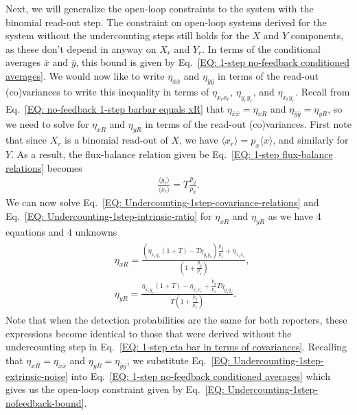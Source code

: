 \documentclass[%
 reprint,prx,
superscriptaddress,
%
%
%
%
%
%
%
%
%
 amsmath,amssymb,
 aps,
%
%
%
%
%
%
]{revtex4-2}
\begin{document}
{{Next, we will generalize the open-loop constraints to the system with the binomial read-out step. The constraint on open-loop systems derived for the system without the undercounting steps still holds for the $X$ and $Y$ components, as these don't depend in anyway on $X_{r}$ and $Y_{r}$. In terms of the conditional averages $\bar{x}$ and $\bar{y}$, this bound is given by Eq.~\eqref{EQ: 1-step no-feedback conditioned averages}. We would now like to write $\eta_{\bar{x}\bar{x}}$ and $\eta_{\bar{y}\bar{y}}$ in terms of the read-out (co)variances to write this inequality in terms of $\eta_{x_{r}x_{r}}$, $\eta_{y_{r}y_{r}}$, and $\eta_{x_{r}y_{r}}$. Recall from Eq.~\eqref{EQ: no-feedback 1-step barbar equals xR} that $\eta_{\bar{x}\bar{x}} = \eta_{xR}$ and $\eta_{\bar{y}\bar{y}} = \eta_{yR}$, so we need to solve for $\eta_{xR}$ and $\eta_{yR}$ in terms of the read-out (co)variances. 
First note that since $X_{r}$ is a binomial read-out of $X$, we have $\langle x_{r} \rangle = p_{x} \langle x \rangle$, and similarly for $Y$. As a result, the flux-balance relation given be Eq.~\eqref{EQ: 1-step flux-balance relations} becomes
\begin{align}
     \frac{\langle y_{r} \rangle}{\langle x_{r} \rangle} = T\frac{p_{y}}{p_{x}}.
    \label{EQ: Undercounting-1step-intrinsic-ratio}
\end{align}
We can now solve Eq.~\eqref{EQ: Undercounting-1step-covariance-relations} and  Eq.~\eqref{EQ: Undercounting-1step-intrinsic-ratio} for $\eta_{xR}$ and $\eta_{yR}$ as we have 4 equations and 4 unknowns
\begin{align}
    \begin{split}
    &\eta_{xR} = \frac{\left(\eta_{x_{r}y_{r}}(1+T) - T\eta_{y_{r}y_{r}}\right)\frac{p_{y}}{p_{x}} + \eta_{x_{r}x_{r}} }{{\left(1+\frac{p_{y}}{p_{x}}\right)}},\\
   &\eta_{yR} = \frac{\eta_{x_{r}y_{r}}(1+T) - \eta_{x_{r}x_{r}} + \frac{p_{y}}{p_{x}}T\eta_{y_{r}y_{r}}}{{T\left(1+\frac{p_{y}}{p_{x}}\right)}}.  
   \end{split}
   \label{EQ: Undercounting-1step-extrinsic-noise}
\end{align}
Note that when the detection probabilities are the same for both reporters, these expressions become identical to those that were derived without the undercounting step in Eq.~\eqref{EQ: 1-step eta bar in terms of covariances}. Recalling that $\eta_{xR} = \eta_{\bar{x}\bar{x}}$ and $\eta_{yR} = \eta_{\bar{y}\bar{y}}$, we substitute Eq.~\eqref{EQ: Undercounting-1step-extrinsic-noise} into Eq.~\eqref{EQ: 1-step no-feedback conditioned averages} which gives us the open-loop constraint given by Eq.~\eqref{EQ: Undercounting-1step-nofeedback-bound}. 

}}
\end{document}
